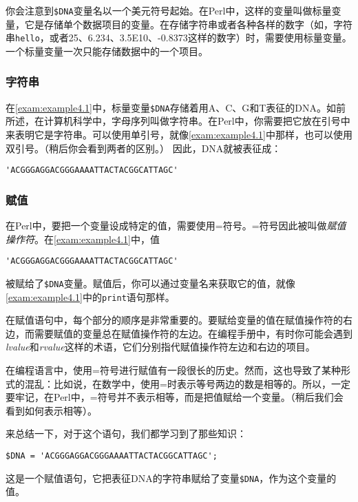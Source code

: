 你会注意到\verb|$DNA|变量名以一个美元符号起始。在Perl中，这样的变量叫做标量变量，它是存储单个数据项目的变量。在存储字符串或者各种各样的数字（如，字符串\verb|hello|，或者25、6.234、3.5E10、-0.8373这样的数字）时，需要使用标量变量。一个标量变量一次只能存储数据中的一个项目。

\subsubsection{字符串}
在\autoref{exam:example4.1}中，标量变量\verb|$DNA|存储着用A、C、G和T表征的DNA。如前所述，在计算机科学中，字母序列叫做字符串。在Perl中，你需要把它放在引号中来表明它是字符串。可以使用单引号，就像\autoref{exam:example4.1}中那样，也可以使用双引号。（稍后你会看到两者的区别。）
因此，DNA就被表征成：

\begin{lstlisting}
'ACGGGAGGACGGGAAAATTACTACGGCATTAGC'
\end{lstlisting}

\subsubsection{赋值}
\label{sect:sect4.2.4.3}
在Perl中，要把一个变量设成特定的值，需要使用=符号。=符号因此被叫做\textit{赋值操作符}。在\autoref{exam:example4.1}中，值

\begin{lstlisting}
'ACGGGAGGACGGGAAAATTACTACGGCATTAGC' 
\end{lstlisting}
被赋给了\verb|$DNA|变量。赋值后，你可以通过变量名来获取它的值，就像\autoref{exam:example4.1}中的\verb|print|语句那样。

在赋值语句中，每个部分的顺序是非常重要的。要赋给变量的值在赋值操作符的右边，而需要赋值的变量总在赋值操作符的左边。在编程手册中，有时你可能会遇到\textit{lvalue}和\textit{rvalue}这样的术语，它们分别指代赋值操作符左边和右边的项目。

在编程语言中，使用=符号进行赋值有一段很长的历史。然而，这也导致了某种形式的混乱：比如说，在数学中，使用=时表示等号两边的数是相等的。所以，一定要牢记，在Perl中，=符号并不表示相等，而是把值赋给一个变量。（稍后我们会看到如何表示相等）。

来总结一下，对于这个语句，我们都学习到了那些知识：

\begin{lstlisting}
$DNA = 'ACGGGAGGACGGGAAAATTACTACGGCATTAGC';
\end{lstlisting}

这是一个赋值语句，它把表征DNA的字符串赋给了变量\verb|$DNA|，作为这个变量的值。

